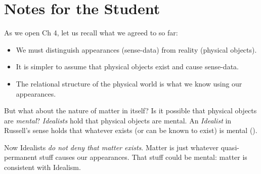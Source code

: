 \documentclass[oneside,letterpaper,12pt]{book}
\begin{document}
\protect\hypertarget{link2HCH0005}{}{}
\pagebreak
\section{Notes for the Student}
As we open Ch 4, let us recall what we agreed to so far:
\begin{itemize}%
	\item We must distinguish appearances (sense-data) from reality (physical objects).
	\item It is simpler to assume that physical objects exist and cause sense-data.
	\item The relational structure of the physical world is what we know using our appearances.
\end{itemize}
But what about the nature of matter in itself? Is it possible that physical objects are \textit{mental}? \textit{Idealists} hold that physical objects are mental. An \textit{Idealist} in Russell's sense holds that whatever exists (or can be known to exist) is mental (\pageref{idealism}).

Now Idealists \textit{do not deny that matter exists}. Matter is just whatever quasi-permanent stuff causes our appearances. That stuff could be mental: matter is consistent with Idealism. %
\end{document}
